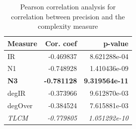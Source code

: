 \documentclass[twoside,leqno,twocolumn]{article}
\begin{document}
\begin{table}[]
    \centering
    \begin{tabular}{lrr}
    \toprule
    Measure &  Cor. coef &      p-value \\
    \midrule
        IR &  -0.469837 & 8.621288e-04 \\
        N1 &  -0.748928 & 1.410436e-09 \\
        \textbf{N3} &  \textbf{-0.781128} & \textbf{9.319564e-11} \\
        degIR &  -0.373966 & 9.612870e-03 \\
        degOver &  -0.384524 & 7.615881e-03 \\
       \emph{TLCM} &  \textit{-0.779805} & \textit{1.051292e-10} \\
    \bottomrule
    \end{tabular}
    \caption{\label{tab:precision}Pearson correlation analysis for correlation between precision and the complexity measure}
\end{table}
\end{document}
